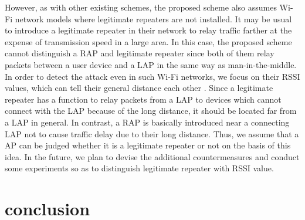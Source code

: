 \documentclass[conference]{IEEEtran}
\begin{document}
However, as with other existing schemes, the proposed scheme also assumes Wi-Fi network models where legitimate repeaters are not installed.
It may be usual to introduce a legitimate repeater in their network to relay traffic farther at the expense of transmission speed in a large area.
In this case, the proposed scheme cannot distinguish a RAP and legitimate repeater since both of them relay packets between a user device and a LAP in the same way as man-in-the-middle.
In order to detect the attack even in such Wi-Fi networks, we focus on their RSSI values, which can tell their general distance each other \cite{rssi}.
Since a legitimate repeater has a function to relay packets from a LAP to devices which cannot connect with the LAP because of the long distance, it should be located far from a LAP in general.
In contrast, a RAP is basically introduced near a connecting LAP not to cause traffic delay due to their long distance.
Thus, we assume that a AP can be judged whether it is a legitimate repeater or not on the basis of this idea.
In the future, we plan to devise the additional countermeasures and conduct some experiments so as to distinguish legitimate repeater with RSSI value.

\section{conclusion}\label{sec:6}




\vspace{12pt}
\end{document}
